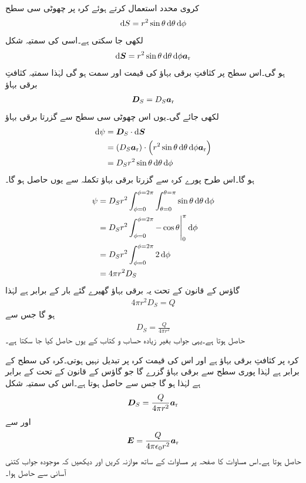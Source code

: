 کروی محدد استعمال کرتے ہوئے کرہ پر چھوٹی سی سطح
\begin{align*}
\dif S=r^2 \sin \theta \dif \theta \dif \phi
\end{align*}
لکھی جا سکتی ہے۔اسی کی سمتیہ شکل
\begin{align*}
\dif \kvec{S}=r^2 \sin \theta \dif \theta \dif \phi \ar
\end{align*}
ہو گی۔اس سطح پر کثافتِ برقی بہاؤ کی قیمت  اور سمت  ہو گی لہٰذا سمتیہ کثافتِ برقی بہاؤ 
\begin{align*}
{\ensuremath{{\boldsymbol{D}}}}_S=D_S {\boldsymbol{a}}_{\textup{r}}
\end{align*}
لکھی جائے گی۔یوں اس چھوٹی سی سطح سے گزرتا برقی بہاؤ
\begin{align*}
\dif \psi&=\kvec{D}_S \cdot \dif \kvec{S}\\
&=\left( D_S \ar \right) \cdot \left(r^2 \sin \theta \dif \theta \dif \phi \ar \right)\\
&= D_S r^2 \sin \theta \dif \theta \dif \phi
\end{align*}
ہو  گا۔اس طرح پورے کرہ سے گزرتا برقی بہاؤ تکملہ سے یوں حاصل ہو گا۔
\begin{align*}
\psi&=D_S r^2  \int_{\phi=0}^{\phi=2\pi}\int_{\theta=0}^{\theta=\pi} \sin \theta \dif \theta \dif \phi\\
&=D_S r^2 \int_{\phi=0}^{\phi=2\pi} \eval{-\cos \theta}_0^{\pi} \dif \phi\\
&=D_S r^2 \int_{\phi=0}^{\phi=2\pi} 2 \dif \phi\\
&=4 \pi r^2 D_S
\end{align*}
گاؤس کے قانون کے تحت یہ برقی بہاؤ گھیرے گئے بار  کے برابر ہے لہٰذا
\begin{align*}
4 \pi r^2 D_S=Q
\end{align*}
ہو گا جس سے
\begin{align*}
D_S=\frac{Q}{4 \pi r^2}
\end{align*}
حاصل ہوتا ہے۔یہی جواب بغیر زیادہ حساب و کتاب کے یوں حاصل کیا جا سکتا ہے۔

کرہ پر کثافتِ برقی بہاؤ      ہے اور اس کی قیمت کرہ پر تبدیل نہیں ہوتی۔کرہ کی سطح  کے برابر ہے لہٰذا پوری سطح سے  برقی بہاؤ گزرے گا جو گاؤس کے قانون کے تحت  کے برابر ہے لہٰذا  ہو گا جس سے  حاصل ہوتا ہے۔اس کی سمتیہ شکل
\begin{align}
{\ensuremath{{\boldsymbol{D}}}}_S=\frac{Q}{4\pi r^2} {\boldsymbol{a}}_{\textup{r}}
\end{align}
اور  سے
\begin{align}
{\ensuremath{{\boldsymbol{E}}}}=\frac{Q}{4\pi \epsilon_0 r^2} {\boldsymbol{a}}_{\textup{r}}
\end{align}
حاصل ہوتا ہے۔اس مساوات کا صفحہ  پر مساوات  کے ساتھ موازنہ کریں اور دیکھیں کہ موجودہ جواب کتنی آسانی سے حاصل ہوا۔

